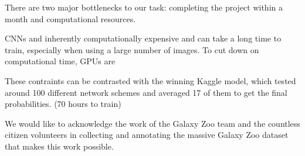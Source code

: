 \documentclass[twocolumn]{aastex6}
\begin{document}
There are two major bottlenecks to our task: completing the project within a month and computational resources. 

CNNs and inherently computationally expensive and can take a long time to train, especially when using a large number of images. To cut down on computational time, GPUs are 

These contraints can be contrasted with the winning Kaggle model, which tested around 100 different network schemes and averaged 17 of them to get the final probabilities. (70 hours to train)


We would like to acknowledge the work of the Galaxy Zoo team and the countless citizen volunteers in collecting and annotating the massive Galaxy Zoo dataset that makes this work possible. 


\end{document}

